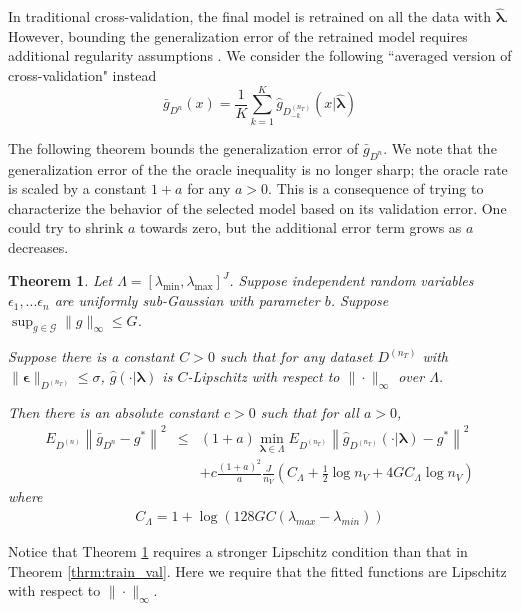 \documentclass[12pt]{article}
\newtheorem{theorem}{Theorem}
\begin{document}
In traditional cross-validation, the final model is retrained on all the data with $\hat{\boldsymbol{\lambda}}$. However, bounding the generalization error of the retrained model requires additional regularity assumptions \citep{lecue2012oracle}. We consider the following ``averaged version of cross-validation" instead
\begin{equation}
\bar{g}_{D^{n}}(x) = \frac{1}{K} \sum_{k=1}^K \hat{g}_{D^{(n_T)}_{-k}}
(x | \hat{\boldsymbol \lambda})
\end{equation}

The following theorem bounds the generalization error of $\bar{g}_{D^{n}}$. We note that the generalization error of the the oracle inequality is no longer sharp; the oracle rate is scaled by a constant $1+a$ for any $a > 0$. This is a consequence of trying to characterize the behavior of the selected model based on its validation error. One could try to shrink $a$ towards zero, but the additional error term grows as $a$ decreases.

\begin{theorem}
\label{thrm:kfold}
Let $\Lambda = [\lambda_{\min}, \lambda_{\max}]^J$. 
Suppose independent random variables $\epsilon_1, ... \epsilon_n$ are uniformly sub-Gaussian with parameter $b$. 
Suppose $\sup_{g \in \mathcal{G}} \|g\|_\infty \le G$.

Suppose there is a constant $C>0$ such that for any dataset $D^{(n_T)}$ with $\|\boldsymbol{\epsilon}\|_{D^{(n_T)}} \le \sigma$, $\hat g (\cdot |\boldsymbol{\lambda} )$ is $C$-Lipschitz with respect to $\| \cdot \|_\infty$ over $\Lambda$.

Then there is an absolute constant $c > 0$ such that for all $a > 0$,
\begin{eqnarray}
E_{D^{(n)}} \left \| \bar{g}_{D^{n}} - g^* \right \|^2 &\le&
(1+a) \min_{\boldsymbol{\lambda} \in \Lambda}  E_{D^{(n_T)}} \left \| \hat{g}_{D^{(n_T)}}(\cdot |\boldsymbol \lambda) - g^* \right \|^2 \\
&& +  c \frac{(1+a)^2}{a} \frac{J}{n_V} 
\left (
C_\Lambda + \frac{1}{2} \log n_V +  4G C_\Lambda \log n_V
\right )
\end{eqnarray}
where 
\begin{eqnarray}
C_\Lambda = 1+\log\left(128GC(\lambda_{max}-\lambda_{min})\right)
\end{eqnarray}
\end{theorem}

Notice that Theorem \ref{thrm:kfold} requires a stronger Lipschitz condition than that in Theorem \ref{thrm:train_val}. Here we require that the fitted functions are Lipschitz with respect to $\| \cdot \|_\infty$.
\end{document}
